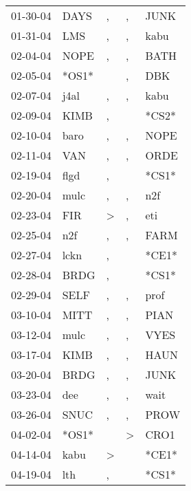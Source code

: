 \begin{supertabular}{lllll}
 01-30-04 &   DAYS &                , &                , &   JUNK \\
 01-31-04 &    LMS &                , &                , &   kabu \\
 02-04-04 &   NOPE &                , &                , &   BATH \\
 02-05-04 &  *OS1* &                  &                , &    DBK \\
 02-07-04 &   j4al &                , &                , &   kabu \\
 02-09-04 &   KIMB &                , &                  &  *CS2* \\
 02-10-04 &   baro &                , &                , &   NOPE \\
 02-11-04 &    VAN &                , &                , &   ORDE \\
 02-19-04 &   flgd &                , &                  &  *CS1* \\
 02-20-04 &   mulc &                , &                , &    n2f \\
 02-23-04 &    FIR &     \textgreater &                , &    eti \\
 02-25-04 &    n2f &                , &                , &   FARM \\
 02-27-04 &   lckn &                , &                  &  *CE1* \\
 02-28-04 &   BRDG &                , &                  &  *CS1* \\
 02-29-04 &   SELF &                , &                , &   prof \\
 03-10-04 &   MITT &                , &                , &   PIAN \\
 03-12-04 &   mulc &                , &                , &   VYES \\
 03-17-04 &   KIMB &                , &                , &   HAUN \\
 03-20-04 &   BRDG &                , &                , &   JUNK \\
 03-23-04 &    dee &                , &                , &   wait \\
 03-26-04 &   SNUC &                , &                , &   PROW \\
 04-02-04 &  *OS1* &                  &     \textgreater &   CRO1 \\
 04-14-04 &   kabu &     \textgreater &                  &  *CE1* \\
 04-19-04 &    lth &                , &                  &  *CS1* \\

\end{supertabular}

